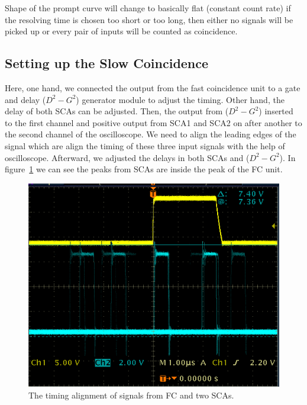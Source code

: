 Shape of the prompt curve will change to basically flat (constant count rate) if the resolving time is chosen too short or too long, then either no signals will be picked up or every pair of inputs will be counted as coincidence.

\subsection{Setting up the Slow Coincidence}

Here, one hand,  we connected the output from the fast coincidence unit to a gate and delay ($ D^{2}-G^{2} $) generator module to adjust the timing. Other hand, the delay of both SCAs can be adjusted. Then, the output from ($ D^{2}-G^{2} $) inserted to the first channel and positive output from SCA1 and SCA2 on after another to the second channel of the oscilloscope. We need to align the leading edges of the signal which are align the timing of these three input signals with the help of oscilloscope. Afterward, we adjusted the delays in both SCAs and ($ D^{2}-G^{2} $). In figure~\ref{fig:slow} we can see the peaks from SCAs are inside the peak of the FC unit.


\begin{figure}[ht]
	\centering
	\includegraphics[width=0.6\linewidth]{./figs/slow.png}
	\caption{The timing alignment of signals from FC and two SCAs.}%
	\label{fig:slow}
\end{figure}


